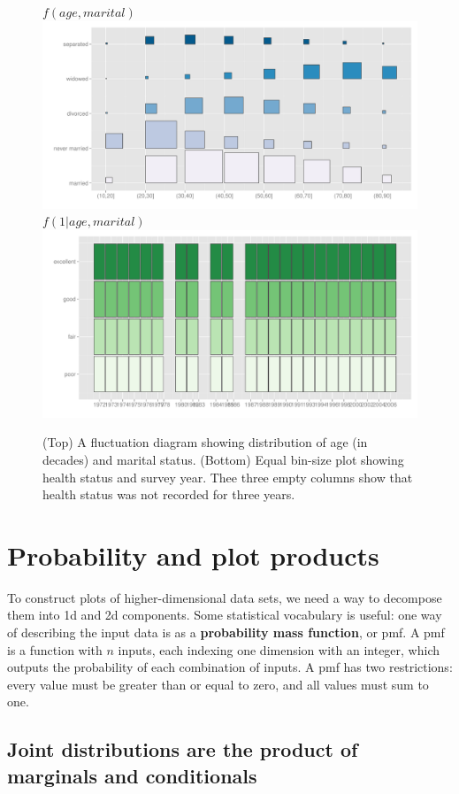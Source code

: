 \documentclass[journal]{vgtc}
\begin{document}
\begin{figure}[htbp]
  \centering
  $f(age, marital)$
    \includegraphics[width=0.9 \linewidth]{part-fluct}
  $f(1 | age, marital)$
    \includegraphics[width=0.9 \linewidth]{part-fluct-cond}
  \caption{(Top) A fluctuation diagram showing distribution of age (in decades) and marital status. (Bottom) Equal bin-size plot showing health status and survey year. Thee three empty columns show that health status was not recorded for three years.}
  \label{fig:fluct}
\end{figure}

\section{Probability and plot products}
\label{sec:combination}

To construct plots of higher-dimensional data sets, we need a way to decompose them into 1d and 2d components. Some statistical vocabulary is useful: one way of describing the input data is as a {\bf probability mass function}, or {\sc pmf}. A {\sc pmf} is a function with $n$ inputs, each indexing one dimension with an integer, which outputs the probability of each combination of inputs. A {\sc pmf} has two restrictions: every value must be greater than or equal to zero, and all values must sum to one.  

\subsection{Joint distributions are the product of marginals and conditionals}
\end{document}
